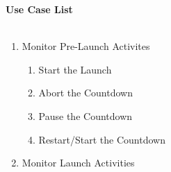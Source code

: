 \documentclass[letterpaper]{article}
\begin{document}
\noindent
\textbf{Use Case List}\\\\
\begin{enumerate}
\item Monitor Pre-Launch Activites
   \begin{enumerate}
      \item Start the Launch
      \item Abort the Countdown
      \item Pause the Countdown
      \item Restart/Start the Countdown
   \end{enumerate}
\item Monitor Launch Activities
\end{enumerate}
\end{document}
